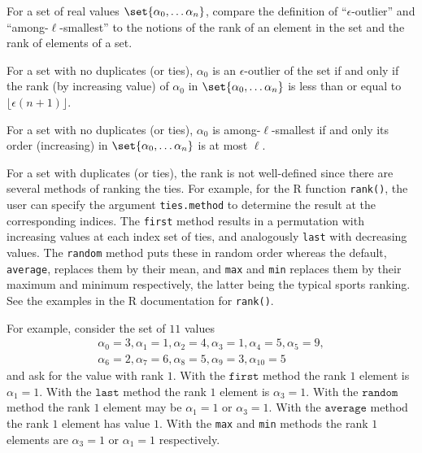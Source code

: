 \documentclass[12pt]{article}
\begin{document}
\begin{exercise}
    For a set of real values \( \set{\alpha_0, \dots \alpha_n} \),
    compare the definition of ``\( \epsilon \)-outlier'' and ``among-\(
    \ell \)-smallest'' to the notions of the rank of an element in the
    set and the rank of elements of a set.
\end{exercise}
\begin{solution}
    For a set with no duplicates (or ties), \( \alpha_0 \) is an \(
    \epsilon \)-outlier of the set if and only if the rank (by
    increasing value) of \( \alpha_0 \) in \( \set{\alpha_0, \dots
    \alpha_n} \) is less than or equal to \( \lfloor \epsilon(n+1)
    \rfloor \).

    For a set with no duplicates (or ties), \( \alpha_0 \) is among-\(
    \ell \)-smallest if and only its order (increasing) in \( \set{\alpha_0,
    \dots \alpha_n} \) is at most \( \ell \).

    For a set with duplicates (or ties), the rank is not well-defined
    since there are several methods of ranking the ties.  For example,
    for the R function \texttt{rank()}, the user can specify the
    argument \texttt{ties.method} to determine the result at the
    corresponding indices.  The \texttt{first} method results in a
    permutation with increasing values at each index set of ties, and
    analogously \texttt{last} with decreasing values.  The \texttt{random}
    method puts these in random order whereas the default, \texttt{average},
    replaces them by their mean, and \texttt{max} and \texttt{min}
    replaces them by their maximum and minimum respectively, the latter
    being the typical sports ranking.  See the examples in the R
    documentation for \texttt{rank()}.

    For example, consider the set of \( 11 \) values
    \begin{multline*}
        \alpha_0 = 3, \alpha_1 = 1, \alpha_2 = 4, \alpha_3 = 1, \alpha_4
        = 5, \alpha_5 = 9, \\
        \alpha_6 = 2, \alpha_7 = 6, \alpha_8 = 5, \alpha_9 = 3, \alpha_
        {10} = 5
    \end{multline*}
    and ask for the value with rank \( 1 \).  With the \( \texttt{first}
    \) method the rank \( 1 \) element is \( \alpha_1 = 1 \).  With the \(
    \texttt{last} \) method the rank \( 1 \) element is \( \alpha_3 = 1 \).
    With the \( \texttt{random} \) method the rank \( 1 \) element may
    be \( \alpha_1 = 1 \) or \( \alpha_3 = 1 \).  With the \( \texttt{average}
    \) method the rank \( 1 \) element has value \( 1 \).  With the
    \texttt{max} and \texttt{min} methods the rank \( 1 \) elements are \(
    \alpha_3 = 1 \) or \( \alpha_1 = 1 \) respectively.


\end{solution}
\end{document}
